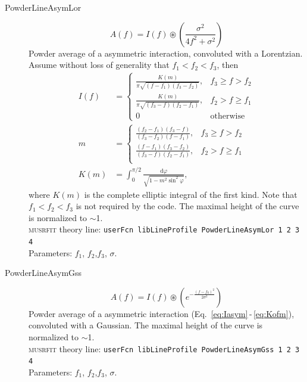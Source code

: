\documentclass[twoside]{article}
\newcommand{\musrfit}{\textsc{musrfit}\xspace}
\begin{document}
\begin{description}
\item[PowderLineAsymLor]
   \begin{equation}
    A(f)= I(f)\circledast\left( \frac{\sigma^2}{4f^2+\sigma^2} \right)
   \end{equation}
   Powder average of a asymmetric interaction, convoluted with a Lorentzian. 
   Assume without loss of generality that $f_1<f_2<f_3$, then
   \begin{align}\label{eq:Iasym}
      I(f)&=\left\{\begin{matrix}
        \frac{K(m)}{\pi\sqrt{(f-f_1)(f_3-f_2)}},& f_3\geq f>f_2 \\[9pt]
        \frac{K(m)}{\pi\sqrt{(f_3-f)(f_2-f_1)}},& f_2>f\geq f_1\\[9pt]
        0 & \text{otherwise}
      \end{matrix} \right.  \\
      m&=\left\{\begin{matrix}
        \frac{(f_2-f_1)(f_3-f)}{(f_3-f_2)(f-f_1)},& f_3\geq f>f_2 \\[6pt]
        \frac{(f-f_1)(f_3-f_2)}{(f_3-f)(f_2-f_1)},& f_2>f\geq f_1\\[6pt]
      \end{matrix} \right.  \\\label{eq:Kofm}
      K(m)&=\int_0^{\pi/2}\frac{\mathrm d\varphi}{\sqrt{1-m^2\sin^2{\varphi}}},
   \end{align}
   where $K(m)$ is the complete elliptic integral of the first kind.
   Note that $f_1<f_2<f_3$ is not required by the code.
   The maximal height of the curve is normalized to $\sim$1.
   \\[1.5ex]
   \musrfit theory line: \verb?userFcn libLineProfile PowderLineAsymLor 1 2 3 4?
\\[1.5ex]
    Parameters: $f_1$, $f_2$,$f_3$, $\sigma$. 

\item[PowderLineAsymGss]
   \begin{equation}
    A(f)= I(f)\circledast\left( e^{-\frac{(f-f_0)^2}{2 \sigma^2}} \right)
   \end{equation}
   Powder average of a asymmetric interaction {(Eq.~\ref{eq:Iasym}\,-\,\ref{eq:Kofm})}, convoluted with a Gaussian. 
   The maximal height of the curve is normalized to $\sim$1.
   \\[1.5ex]
   \musrfit theory line: \verb?userFcn libLineProfile PowderLineAsymGss 1 2 3 4?
\\[1.5ex]
    Parameters: $f_1$, $f_2$,$f_3$, $\sigma$. 
\end{description}
\end{document}
